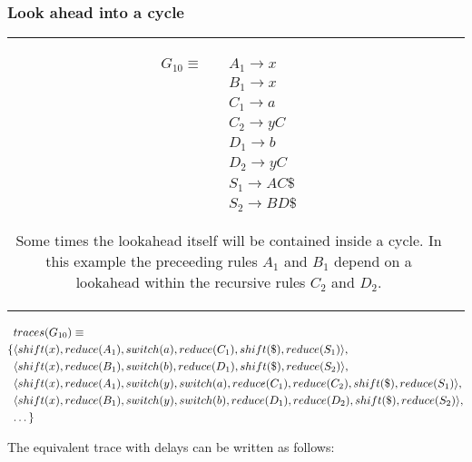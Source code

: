 \documentclass[a4paper,11pt]{article}
\begin{document}


\subsubsection{Look ahead into a cycle}
\begin{tabular}[t]{cl}
\parbox{.3\textwidth}{
\begin{align*}
G_{10} \equiv \quad & A_1 \rightarrow x\\
                  & B_1 \rightarrow x\\
                  & C_1 \rightarrow a\\
                  & C_2 \rightarrow y C\\
                  & D_1 \rightarrow b\\
                  & D_2 \rightarrow y C\\
                  & S_1 \rightarrow A C \$\\
                  & S_2 \rightarrow B D \$
\end{align*}}
\parbox{.8\textwidth}{Some times the lookahead itself will be contained inside a cycle.
In this example the preceeding rules $A_1$ and $B_1$ depend on a lookahead within the recursive rules $C_2$ and $D_2$.}
\end{tabular}

\parbox{.3\textwidth}{\begin{align*}
&traces(G_{10}) \equiv \\
\{ & \langle shift(x), reduce(A_1), switch(a), reduce(C_1), shift(\$), reduce(S_1) \rangle,\\
   & \langle shift(x), reduce(B_1), switch(b), reduce(D_1), shift(\$), reduce(S_2) \rangle,\\
   & \langle shift(x), reduce(A_1), switch(y), switch(a), reduce(C_1), reduce(C_2), shift(\$), reduce(S_1) \rangle,\\
   & \langle shift(x), reduce(B_1), switch(y), switch(b), reduce(D_1), reduce(D_2), shift(\$), reduce(S_2) \rangle,\\
   & \textellipsis \}
\end{align*}}

The equivalent trace with delays can be written as follows:
\end{document}

